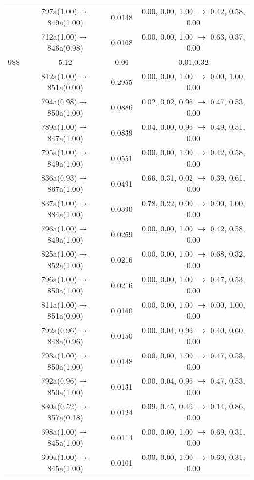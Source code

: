 \documentclass[10pt,a4paper]{article}
\begin{document}
\begin{longtable}{c|c|c|c}
 	& 797a(1.00)$\rightarrow$849a(1.00) &	 0.0148 &	 0.00, 0.00, 1.00 $\rightarrow$ 0.42, 0.58, 0.00 \\ 
 	& 712a(1.00)$\rightarrow$846a(0.98) &	 0.0108 &	 0.00, 0.00, 1.00 $\rightarrow$ 0.63, 0.37, 0.00 \\ 
 \hline988 &	 5.12 &	 0.00 &	 0.01,0.32 \\ 
  	& 812a(1.00)$\rightarrow$851a(0.00) &	 0.2955 &	 0.00, 0.00, 1.00 $\rightarrow$ 0.00, 1.00, 0.00 \\ 
 	& 794a(0.98)$\rightarrow$850a(1.00) &	 0.0886 &	 0.02, 0.02, 0.96 $\rightarrow$ 0.47, 0.53, 0.00 \\ 
 	& 789a(1.00)$\rightarrow$847a(1.00) &	 0.0839 &	 0.04, 0.00, 0.96 $\rightarrow$ 0.49, 0.51, 0.00 \\ 
 	& 795a(1.00)$\rightarrow$849a(1.00) &	 0.0551 &	 0.00, 0.00, 1.00 $\rightarrow$ 0.42, 0.58, 0.00 \\ 
 	& 836a(0.93)$\rightarrow$867a(1.00) &	 0.0491 &	 0.66, 0.31, 0.02 $\rightarrow$ 0.39, 0.61, 0.00 \\ 
 	& 837a(1.00)$\rightarrow$884a(1.00) &	 0.0390 &	 0.78, 0.22, 0.00 $\rightarrow$ 0.00, 1.00, 0.00 \\ 
 	& 796a(1.00)$\rightarrow$849a(1.00) &	 0.0269 &	 0.00, 0.00, 1.00 $\rightarrow$ 0.42, 0.58, 0.00 \\ 
 	& 825a(1.00)$\rightarrow$852a(1.00) &	 0.0216 &	 0.00, 0.00, 1.00 $\rightarrow$ 0.68, 0.32, 0.00 \\ 
 	& 796a(1.00)$\rightarrow$850a(1.00) &	 0.0216 &	 0.00, 0.00, 1.00 $\rightarrow$ 0.47, 0.53, 0.00 \\ 
 	& 811a(1.00)$\rightarrow$851a(0.00) &	 0.0160 &	 0.00, 0.00, 1.00 $\rightarrow$ 0.00, 1.00, 0.00 \\ 
 	& 792a(0.96)$\rightarrow$848a(0.96) &	 0.0150 &	 0.00, 0.04, 0.96 $\rightarrow$ 0.40, 0.60, 0.00 \\ 
 	& 793a(1.00)$\rightarrow$850a(1.00) &	 0.0148 &	 0.00, 0.00, 1.00 $\rightarrow$ 0.47, 0.53, 0.00 \\ 
 	& 792a(0.96)$\rightarrow$850a(1.00) &	 0.0131 &	 0.00, 0.04, 0.96 $\rightarrow$ 0.47, 0.53, 0.00 \\ 
 	& 830a(0.52)$\rightarrow$857a(0.18) &	 0.0124 &	 0.09, 0.45, 0.46 $\rightarrow$ 0.14, 0.86, 0.00 \\ 
 	& 698a(1.00)$\rightarrow$845a(1.00) &	 0.0114 &	 0.00, 0.00, 1.00 $\rightarrow$ 0.69, 0.31, 0.00 \\ 
 	& 699a(1.00)$\rightarrow$845a(1.00) &	 0.0101 &	 0.00, 0.00, 1.00 $\rightarrow$ 0.69, 0.31, 0.00 \\ 

\end{longtable}
\end{document}
